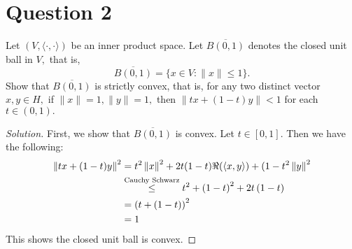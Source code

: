 \section{Question 2}

\horz

Let $(V,\langle \cdot, \cdot \rangle)$ be an inner product space. Let $\overline{B(0,1)}$ denotes the closed unit ball in $V,$ that is, $$\overline{B(0,1)} = \{x\in V : \|x\|\leqslant 1\}.$$
Show that $\overline{B(0,1)}$ is strictly convex, that is, for any two distinct vector $x,y\in H,$ if $\|x\|=1, \|y\|=1,$ then $\|tx+(1-t)y\| < 1$ for each $t\in (0,1).$
 
\horz

\begin{proof}[Solution]
    First, we show that $\overline{B\left( 0,1 \right)}$ is convex. Let $t\in [0,1]$. Then we have the following:
    \begin{align*}
	\left\lVert tx+(1-t)y \right\rVert^{2} &= t^{2} \left\lVert x \right\rVert^{2} + 2t(1-t)\Re(\left\langle x,y \right\rangle) + (1-t^{2} \left\lVert y \right\rVert^{2} \\
	    &\stackrel{\text{Cauchy Schwarz}} {\le} t^{2} + \left( 1-t \right)^{2} + 2t\left( 1-t \right) \\
	    &= \left( t + \left( 1-t \right) \right)^{2} \\
	    &= 1
    \end{align*}
    This shows the closed unit ball is convex. 
\end{proof}
